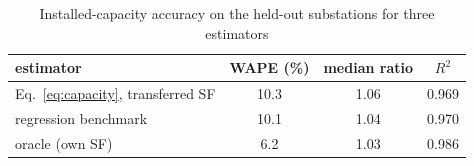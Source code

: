 \begin{table}[t]
\centering
\caption{Installed-capacity accuracy on the held-out substations for three estimators}
\label{tab:capacity}
\begin{tabular}{lccc}
\toprule
estimator & WAPE (\%) & median ratio & $R^2$ \\
\midrule
Eq.~\eqref{eq:capacity}, transferred SF & 10.3 & 1.06 & 0.969 \\
regression benchmark & 10.1 & 1.04 & 0.970 \\
oracle (own SF) & 6.2 & 1.03 & 0.986 \\
\bottomrule
\end{tabular}
\end{table}